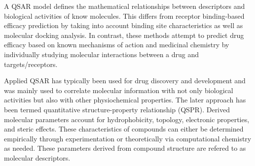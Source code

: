 A QSAR model defines the mathematical relationships between descriptors and biological activities of know molecules. This differs from receptor binding-based efficacy prediction by taking into account binding site characteristics as well as molecular docking analysis. In contrast, these methods attempt to predict drug efficacy based on known mechanisms of action and medicinal chemistry by individually studying molecular interactions between a drug and targets/receptors. \cite{Kruhlak2012}

Applied QSAR has typically been used for drug discovery and development and was mainly used to correlate molecular information with not only biological activities but also with other physiochemical properties. The later approach has been termed quantitative structure-property relationship (QSPR). Derived molecular parameters account for hydrophobicity, topology, electronic properties, and steric effects. These characteristics of compounds can either be determined empirically through experimentation or theoretically via computational chemistry as needed. \cite{Nantasenamat2009} These parameters derived from compound structure are refered to as molecular descriptors.




